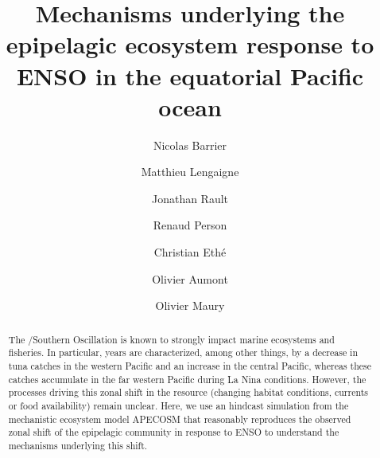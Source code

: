 \documentclass[review, 12pt]{elsarticle}
\begin{document}
\begin{frontmatter}

\title{Mechanisms underlying the epipelagic ecosystem response to ENSO in the equatorial Pacific ocean}

\author[mymainaddress]{Nicolas Barrier}

\author[mymainaddress]{Matthieu Lengaigne}
\author[mymainaddress]{Jonathan Rault}
\author[renaud]{Renaud Person}
\author[chris]{Christian Eth\'{e}}
\author[renaud]{Olivier Aumont}
\author[mymainaddress]{Olivier Maury}


\address[mymainaddress]{MARBEC, Univ. Montpellier, CNRS, Ifremer, IRD, Sète, France}
\address[renaud]{LOCEAN, IRD}
\address[chris]{IPSL, CNRS}

\begin{abstract}

The \nino{}/Southern Oscillation is known to strongly impact marine ecosystems and fisheries. In particular, \nino{} years are characterized, among other things, by a decrease in tuna catches in the western Pacific and an increase in the central Pacific, whereas these catches accumulate in the far western Pacific during La Nina conditions. However, the processes driving this zonal shift in the resource (changing habitat conditions, currents or food availability) remain unclear. Here, we use an hindcast simulation from the mechanistic ecosystem model APECOSM that reasonably reproduces the observed zonal shift of the epipelagic community in response to ENSO to understand the mechanisms underlying this shift.



\end{abstract}
\end{frontmatter}
\end{document}
